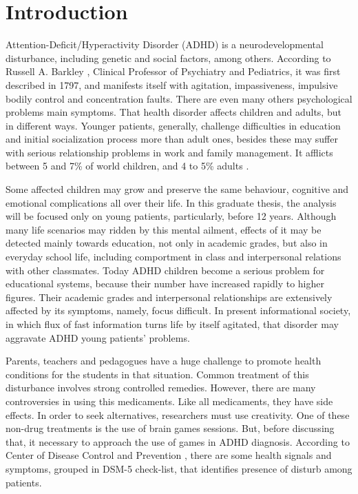 \chapter{Introduction}
\label{ch:introduction}

Attention-Deficit/Hyperactivity Disorder (ADHD) is a neurodevelopmental disturbance, including genetic and social factors, among others. According to Russell A. Barkley \citep{ADHDDay}, Clinical Professor of Psychiatry and Pediatrics, it was first described in 1797, and manifests itself with agitation, impassiveness, impulsive bodily control and concentration faults. There are even many others psychological problems main symptoms. That health disorder affects children and adults, but in different ways. Younger patients, generally, challenge difficulties in education and initial socialization process more than adult ones, besides these may suffer with serious relationship problems in work and family management. It afflicts between 5 and 7\% of world children, and 4 to 5\% adults \citep{ADHDDay}.

Some affected children may grow and preserve the same behaviour, cognitive and emotional complications all over their life. In this graduate thesis, the analysis will be focused only on young patients, particularly, before 12 years. Although many life scenarios may ridden by this mental ailment, effects of it may be detected mainly towards education, not only in academic grades, but also in everyday school life, including comportment in class and interpersonal relations with other classmates. Today ADHD children become a serious problem for educational systems, because their number have increased rapidly to higher figures. Their academic grades and interpersonal relationships are extensively affected by its symptoms, namely, focus difficult. In present informational society, in which flux of fast information turns life by itself agitated, that disorder may aggravate ADHD young patients' problems.  

Parents, teachers and pedagogues have a huge challenge to promote health conditions for the students in that situation. Common treatment of this disturbance involves strong controlled remedies. However, there are many controversies in using this medicaments. Like all medicaments, they have side effects. In order to seek alternatives, researchers must use creativity. One of these non-drug treatments is the use of brain games sessions.  But, before discussing that, it necessary to approach the use of games in ADHD diagnosis. According to Center of Disease Control and Prevention \citep{DSM-5}, there are some health signals and symptoms, grouped in DSM-5 check-list, that identifies presence of disturb among patients. 


